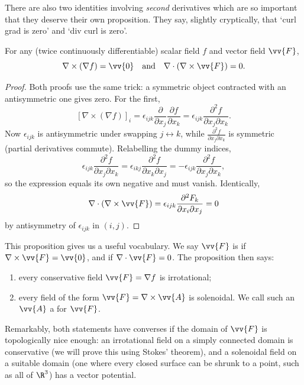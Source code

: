 There are also two identities involving \emph{second} derivatives which are so important that they deserve their own proposition. They say, slightly cryptically, that `curl grad is zero' and `div curl is zero'.

\begin{proposition}
	For any (twice continuously differentiable) scalar field $f$ and vector field $\vv{F}$,
	$$
	\nabla \times (\nabla f) = \vv{0} \quad \text{and} \quad \nabla \cdot (\nabla \times \vv{F}) = 0.
	$$
\end{proposition}
\begin{proof}
	Both proofs use the same trick: a symmetric object contracted with an antisymmetric one gives zero. For the first,
	$$
	[\nabla \times (\nabla f)]_i = \epsilon_{ijk} \frac{\partial}{\partial x_j} \frac{\partial f}{\partial x_k} = \epsilon_{ijk} \frac{\partial^2 f}{\partial x_j \partial x_k}.
	$$
	Now $\epsilon_{ijk}$ is antisymmetric under swapping $j \leftrightarrow k$, while $\frac{\partial^2 f}{\partial x_j \partial x_k}$ is symmetric (partial derivatives commute). Relabelling the dummy indices,
	$$
	\epsilon_{ijk} \frac{\partial^2 f}{\partial x_j \partial x_k} = \epsilon_{ikj} \frac{\partial^2 f}{\partial x_k \partial x_j} = -\epsilon_{ijk} \frac{\partial^2 f}{\partial x_j \partial x_k},
	$$
	so the expression equals its own negative and must vanish. Identically,
	$$
	\nabla \cdot (\nabla \times \vv{F}) = \epsilon_{ijk}\frac{\partial^2 F_k}{\partial x_i \partial x_j} = 0
	$$
	by antisymmetry of $\epsilon_{ijk}$ in $(i, j)$.
\end{proof}

This proposition gives us a useful vocabulary. We say $\vv{F}$ is  if $\nabla \times \vv{F} = \vv{0}$, and  if $\nabla \cdot \vv{F} = 0$. The proposition then says:
\begin{enumerate}[label=(\roman*)]
	\item every conservative field $\vv{F} = \nabla f$ is irrotational;
	\item every field of the form $\vv{F} = \nabla \times \vv{A}$ is solenoidal. We call such an $\vv{A}$ a  for $\vv{F}$.
\end{enumerate}
Remarkably, both statements have converses if the domain of $\vv{F}$ is topologically nice enough: an irrotational field on a simply connected domain is conservative (we will prove this using Stokes' theorem), and a solenoidal field on a suitable domain (one where every closed surface can be shrunk to a point, such as all of $\R^3$) has a vector potential.

